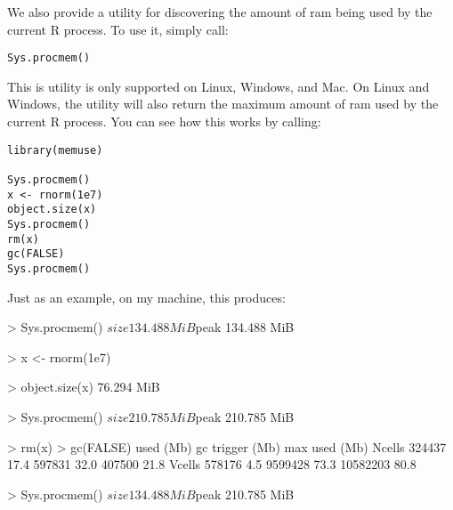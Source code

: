 We also provide a utility for discovering the amount of ram being used by the 
current R process.  To use it, simply call:
\begin{lstlisting}[language=rr]
Sys.procmem()
\end{lstlisting}

This is utility is only supported on Linux, Windows, and Mac.  On Linux and 
Windows, the utility will also return the maximum amount of ram used by the 
current R process.  You can see how this works by calling:

\begin{lstlisting}[language=rr]
library(memuse)

Sys.procmem()
x <- rnorm(1e7)
object.size(x)
Sys.procmem()
rm(x)
gc(FALSE)
Sys.procmem()
\end{lstlisting}

Just as an example, on my machine, this produces:
\vspace{-.6cm}
\begin{Output}
> Sys.procmem()
$size
134.488 MiB

$peak
134.488 MiB

> x <- rnorm(1e7)

> object.size(x)
76.294 MiB

> Sys.procmem()
$size
210.785 MiB

$peak
210.785 MiB

> rm(x)
> gc(FALSE)
         used (Mb) gc trigger (Mb) max used (Mb)
Ncells 324437 17.4     597831 32.0   407500 21.8
Vcells 578176  4.5    9599428 73.3 10582203 80.8

> Sys.procmem()
$size
134.488 MiB

$peak
210.785 MiB

\end{Output}
